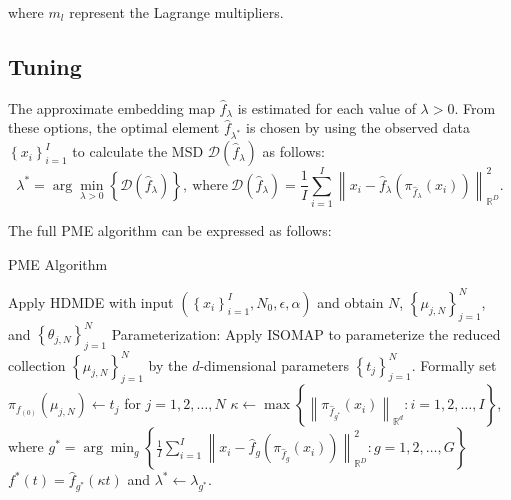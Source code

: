 where $m_l$ represent the Lagrange multipliers.

\subsection*{Tuning}

The approximate embedding map $\hat{f}_{\lambda}$ is estimated for each value of $\lambda > 0$. From these options, the optimal element $\hat{f}_{\lambda^{*}}$ is chosen by using the observed data $\left\{x_i\right\}_{i=1}^{I}$ to calculate the MSD $\mathcal{D}(\hat{f}_\lambda)$ as follows:
\[%
  \lambda^{*} = \arg\min_{\lambda > 0}\left\{\mathcal{D}(\hat{f}_{\lambda})\right\}, \ \text{where} \ \mathcal{D}(\hat{f}_\lambda) = \frac{1}{I}\sum_{i=1}^{I}\left\|x_i - \hat{f}_{\lambda}\left(\pi_{\hat{f}_{\lambda}}(x_i)\right)\right\|_{\mathbb{R}^{D}}^2
.\]%

The full PME algorithm can be expressed as follows:

\begin{algorithm}
  \caption{PME Algorithm}
  \label{alg:pme}
  Apply HDMDE with input $(\left\{x_i\right\}_{i=1}^{I}, N_0, \epsilon, \alpha)$ and obtain $N$, $\left\{\mu_{j, N}\right\}_{j=1}^{N}$, and $\left\{\theta_{j, N}\right\}_{j=1}^{N}$\;
  Parameterization: Apply ISOMAP to parameterize the reduced collection $\left\{\mu_{j, N}\right\}_{j=1}^{N}$ by the $d$-dimensional parameters $\left\{t_j\right\}_{j=1}^{N}$. Formally set $\pi_{f_{(0)}}(\mu_{j, N}) \leftarrow t_j$ for $j = 1, 2, \dots, N$\;
  $\kappa \leftarrow \max\left\{\left\|\pi_{\hat{f}_{g^{*}}}(x_i)\right\|_{\mathbb{R}^{d}}: i = 1, 2, \dots, I\right\}$, where $g^{*} = \arg\min_g\left\{\frac{1}{I}\sum_{i=1}^{I}\left\|x_i - \hat{f}_g\left(\pi_{\hat{f}_g}(x_i)\right)\right\|_{\mathbb{R}^{D}}^2: g = 1, 2, \dots, G\right\}$\;
  $f^{*}(t) = \hat{f}_{g^{*}}(\kappa t)$ and $\lambda^{*} \leftarrow \lambda_{g^{*}}$.
\end{algorithm}

